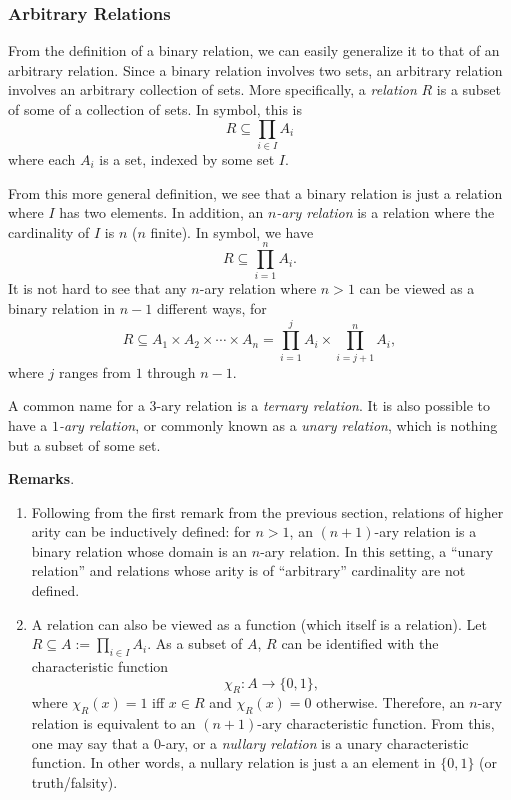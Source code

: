 \documentclass[12pt]{article}
\begin{document}
\subsubsection*{Arbitrary Relations}

From the definition of a binary relation, we can easily generalize it to that of an arbitrary relation.  Since a binary relation involves two sets, an arbitrary relation involves an arbitrary collection of sets.  More specifically, a \emph{relation} $R$ is a subset of some  of a collection of sets.  In symbol, this is $$R\subseteq \prod_{i\in I} A_i$$ where each $A_i$ is a set, indexed by some set $I$.

From this more general definition, we see that a binary relation is just a relation where $I$ has two elements.  In addition, an \emph{$n$-ary relation} is a relation where the cardinality of $I$ is $n$ ($n$ finite).  In symbol, we have $$R\subseteq\prod_{i=1}^n A_i.$$
It is not hard to see that any $n$-ary relation where $n>1$ can be viewed as a binary relation in $n-1$ different ways, for $$R\subseteq A_1\times A_2\times \cdots \times A_n= \prod_{i=1}^j A_i\times \prod_{i=j+1}^n A_i,$$ where $j$ ranges from $1$ through $n-1$.

A common name for a $3$-ary relation is a \emph{ternary relation}.  It is also possible to have a \emph{$1$-ary relation}, or commonly known as a \emph{unary relation}, which is nothing but a subset of some set.

\textbf{Remarks}.  
\begin{enumerate}
\item
Following from the first remark from the previous section, relations of higher arity can be inductively defined: for $n>1$, an $(n+1)$-ary relation is a binary relation whose domain is an $n$-ary relation.  In this setting, a ``unary relation'' and relations whose arity is of ``arbitrary'' cardinality are not defined.
\item
A relation can also be viewed as a function (which itself is a relation).  Let $R\subseteq A:=\prod_{i\in I} A_i$.  As a subset of $A$, $R$ can be identified with the characteristic function $$\chi_R:A\to \lbrace 0,1\rbrace,$$ where $\chi_R(x)=1$ iff $x\in R$ and $\chi_R(x)=0$ otherwise.  Therefore, an $n$-ary relation is equivalent to an $(n+1)$-ary characteristic function.  From this, one may say that a $0$-ary, or a \emph{nullary relation} is a unary characteristic function.  In other words, a nullary relation is just a an element in $\lbrace 0,1\rbrace$ (or truth/falsity).
\end{enumerate}
\end{document}
